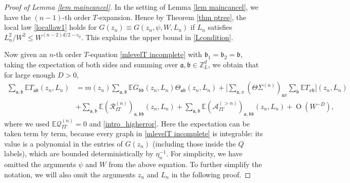 \documentclass{article}
\newcommand{\1}{\mathds{1}}
\numberwithin{equation}{section}
\newcommand{\e}{{\varepsilon}}
\newcommand{\fa}{{\mathfrak a}}
\newcommand{\fb}{{\mathfrak b}}
\renewcommand{\leq}{\leqslant}
\renewcommand{\le}{\leq}
\newcommand{\E}{\mathbb{E}}
\newcommand{\Z}{\mathbb{Z}}
\DeclareMathOperator{\OO}{O}
\theoremstyle{plain} %
\theoremstyle{remark}
\newcommand{\cor}{\color{red}}
\newcommand{\wtSdelta}{\Sigma}
\newcommand{\incomp}{{\text{$T$-equation}}}
\newcommand{\PITn}{{\mathcal R_{IT}^{(n)}}}
\newcommand{\QITn}{{\mathcal Q_{IT}^{(n)}}}
\newcommand{\AITn}{{\mathcal A_{IT}^{(>n)}}}
\begin{document}
\begin{proof}[Proof of Lemma \ref{lem maincancel}]
In the setting of Lemma \ref{lem maincancel}, we have  the $(n-1)$-th order $T$-expansion. Hence by Theorem \ref{thm ptree}, the local law \eqref{locallaw1} holds for $G(z_n)\equiv G(z_n, \psi, W, L_n)$ if $L_n$ satisfies ${L_n^2}/{W^2}  \le W^{(n-2)d/2-c_0} $. This explains the upper bound in \eqref{Lcondition}. %

Now given an $n$-th order $\incomp$ \eqref{mlevelT incomplete} with $\fb_1=\fb_2=\fb$, taking the expectation of both sides and summing over $\fa,\fb \in \Z_L^d$, we obtain that for large enough $D>0$, %
\begin{align}
  \sum_{\fa,\fb}\E T_{\fa\fb}(z_n,  L_n) & =  m(z_n)  \sum_{\fa,\fb}\E\overline G_{\fb\fb}(z_n,  L_n)\Theta_{\fa\fb}(z_n,  L_n) + \Big[\sum_{\fa,x}  (\Theta \wtSdelta^{(n)} )_{\fa x} \sum_{\fb}\E T_{x \fb}\Big](z_n, L_n)\nonumber \\
&   + \sum_{\fa,\fb}\E(\PITn)_{\fa,\fb\fb}(z_n , L_n)   +  \sum_{\fa,\fb}\E(\AITn)_{\fa,\fb\fb}(z_n,  L_n) + \OO (W^{-D}) ,\label{mlevelT sum}
\end{align}
where we used $\E\QITn  =0$ and \eqref{intro_higherror}. Here the expectation can be taken term by term, because every graph in \eqref{mlevelT incomplete} is integrable: its value is a polynomial in the entries of $G(z_n)$ (including those inside the $Q$ labels), which are bounded deterministically by $\eta_n^{-1}$. For simplicity, we have omitted the arguments $\psi$ and $W$ from the above equation. To further simplify the notation,  we will also omit the arguments $z_n$ and $ L_n$ in the following proof.


\end{proof}
\end{document}
